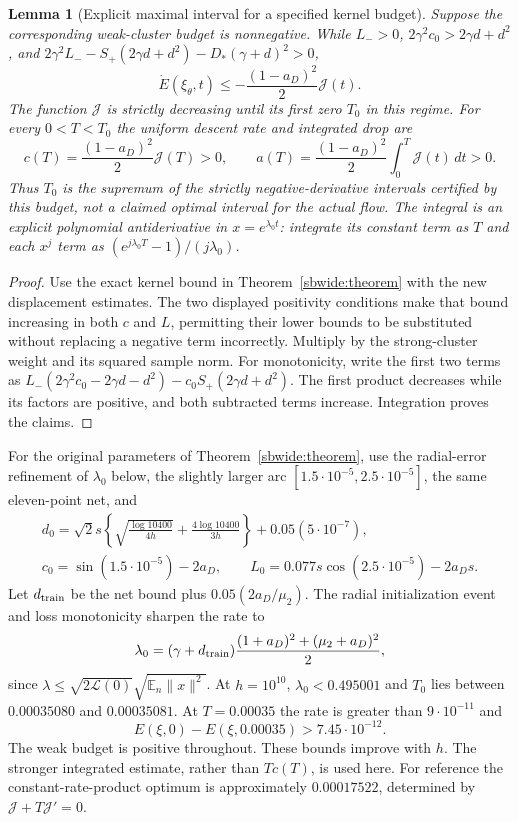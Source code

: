 \documentclass[11pt]{article}
\newtheorem{lemma}[theorem]{Lemma}
\theoremstyle{remark}
\begin{document}
\begin{lemma}[Explicit maximal interval for a specified kernel budget]
\label{sbsharp:descent}
Suppose the corresponding weak-cluster budget is nonnegative.
While $L_->0$, $2\gamma^2c_0>2\gamma d+d^2$, and
$2\gamma^2L_--S_+(2\gamma d+d^2)-D_*(\gamma+d)^2>0$,
\[
 \dot E(\xi_\theta,t)\le-\frac{(1-a_D)^2}{2}\mathcal J(t).
\]
The function $\mathcal J$ is strictly decreasing until its first zero
$T_0$ in this regime. For every $0<T<T_0$ the uniform descent rate and
integrated drop are
\[
 c(T)=\frac{(1-a_D)^2}{2}\mathcal J(T)>0,\qquad
 a(T)=\frac{(1-a_D)^2}{2}\int_0^T\mathcal J(t)\,dt>0.
\]
Thus $T_0$ is the supremum of the strictly negative-derivative intervals
certified by \emph{this budget}, not a claimed optimal interval for the
actual flow. The integral is an explicit polynomial antiderivative in
$x=e^{\lambda_0t}$: integrate its constant term as $T$ and each $x^j$
term as $(e^{j\lambda_0T}-1)/(j\lambda_0)$.
\end{lemma}
\begin{proof}
Use the exact kernel bound in Theorem~\ref{sbwide:theorem} with the
new displacement estimates. The two displayed positivity conditions
make that bound increasing in both $c$ and $L$, permitting their lower
bounds to be substituted without replacing a negative term incorrectly.
Multiply by the strong-cluster weight and its squared sample norm.
For monotonicity, write the first two terms as
$L_-(2\gamma^2c_0-2\gamma d-d^2)-c_0S_+(2\gamma d+d^2)$.
The first product decreases while its factors are positive, and both
subtracted terms increase. Integration proves the claims.
\end{proof}

For the original parameters of Theorem~\ref{sbwide:theorem}, use
the radial-error refinement of $\lambda_0$ below, the slightly larger arc
$[1.5\cdot10^{-5},2.5\cdot10^{-5}]$, the same eleven-point net, and
\begin{gather*}
 d_0=\sqrt2s\left\{\sqrt{\frac{\log10400}{4h}}
             +\frac{4\log10400}{3h}\right\}
             +0.05(5\cdot10^{-7}),\\
 c_0=\sin(1.5\cdot10^{-5})-2a_D,\qquad
 L_0=0.077s\cos(2.5\cdot10^{-5})-2a_Ds.
\end{gather*}
Let $d_{\rm train}$ be the net bound plus $0.05(2a_D/\mu_2)$.
The radial initialization event and loss monotonicity sharpen the rate to
\[
 \lambda_0=(\gamma+d_{\rm train})
        \frac{(1+a_D)^2+(\mu_2+a_D)^2}{2},
\]
since $\lambda\le\sqrt{2\mathcal L(0)}
\sqrt{\mathbb E_n\|x\|^2}$.
At $h=10^{10}$, $\lambda_0<0.495001$ and $T_0$ lies between
$0.00035080$ and $0.00035081$.
At $T=0.00035$ the rate is greater than $9\cdot10^{-11}$ and
\begin{equation}\label{sbsharp:old-drop}
 E(\xi,0)-E(\xi,0.00035)>7.45\cdot10^{-12}.
\end{equation}
The weak budget is positive throughout. These bounds improve with $h$.
The stronger integrated estimate, rather than $Tc(T)$, is used here.
For reference the constant-rate-product optimum is approximately
$0.00017522$, determined by $\mathcal J+T\mathcal J'=0$.
\end{document}
